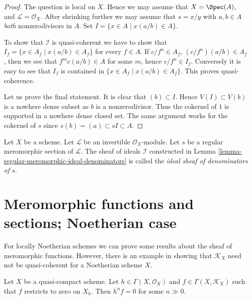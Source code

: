 \begin{proof}
The question is local on $X$.
Hence we may assume that $X = \Spec(A)$,
and $\mathcal{L} = \mathcal{O}_X$. After shrinking further
we may assume that $s = x/y$ with $a, b \in A$ {\it both}
nonzerodivisors in $A$. Set $I = \{x \in A \mid x(a/b) \in A\}$.

\medskip\noindent
To show that $\mathcal{I}$ is quasi-coherent we have to show
that $I_f = \{x \in A_f \mid x(a/b) \in A_f\}$ for every
$f \in A$. If $c/f^n \in A_f$, $(c/f^n)(a/b) \in A_f$, then we see
that $f^mc(a/b) \in A$ for some $m$, hence $c/f^n \in I_f$.
Conversely it is easy to see that $I_f$ is contained in
$\{x \in A_f \mid x(a/b) \in A_f\}$. This proves quasi-coherence.

\medskip\noindent
Let us prove the final statement. It is clear that $(b) \subset I$.
Hence $V(I) \subset V(b)$ is a nowhere dense subset as $b$ is
a nonzerodivisor. Thus the cokernel of $1$ is supported in a nowhere
dense closed set. The same argument works for the cokernel
of $s$ since $s(b) = (a) \subset sI \subset A$.
\end{proof}

\begin{definition}
\label{definition-regular-meromorphic-ideal-denominators}
Let $X$ be a scheme.
Let $\mathcal{L}$ be an invertible $\mathcal{O}_X$-module.
Let $s$ be a regular meromorphic section of $\mathcal{L}$.
The sheaf of ideals $\mathcal{I}$ constructed in
Lemma \ref{lemma-regular-meromorphic-ideal-denominators}
is called the {\it ideal sheaf of denominators of $s$}.
\end{definition}




\section{Meromorphic functions and sections; Noetherian case}
\label{section-meromorphic-noetherian}

\noindent
For locally Noetherian schemes we can prove some results about the
sheaf of meromorphic functions. However, there is an example in
\cite{misconceptions} showing that $\mathcal{K}_X$ need not be quasi-coherent
for a Noetherian scheme $X$.

\begin{lemma}
\label{lemma-meromorphic-section-restricts-to-zero}
Let $X$ be a quasi-compact scheme. Let $h \in \Gamma(X, \mathcal{O}_X)$ and
$f \in \Gamma(X, \mathcal{K}_X)$ such that $f$ restricts
to zero on $X_h$. Then $h^n f = 0$ for some $n \gg 0$.
\end{lemma}

